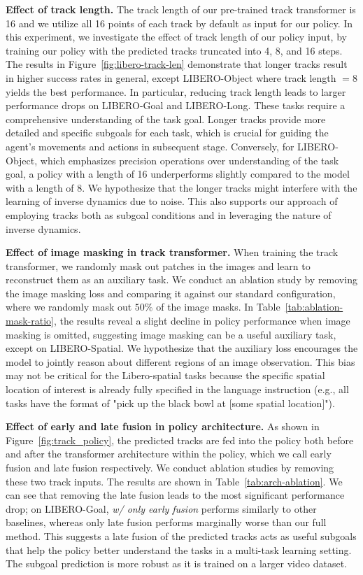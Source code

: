 \noindent\textbf{Effect of track length.}
The track length of our pre-trained track transformer is 16 and we utilize all 16 points of each track by default as input for our policy.
In this experiment, we investigate the effect of track length of our policy input, by training our policy with the predicted tracks truncated into 4, 8, and 16 steps.
The results in Figure~\ref{fig:libero-track-len} demonstrate that longer tracks result in higher success rates in general, except LIBERO-Object where track length $=8$ yields the best performance. 
In particular, reducing track length leads to larger performance drops on LIBERO-Goal and LIBERO-Long.
These tasks require a comprehensive understanding of the task goal. Longer tracks provide more detailed and specific subgoals for each task, which is crucial for guiding the agent's movements and actions in subsequent stage. 
Conversely, for LIBERO-Object, which emphasizes precision operations over understanding of the task goal, a policy with a length of 16 underperforms slightly compared to the model with a length of 8. We hypothesize that the longer tracks might interfere with the learning of inverse dynamics due to noise. This also supports our approach of employing tracks both as subgoal conditions and in leveraging the nature of inverse dynamics.


\noindent\textbf{Effect of image masking in track transformer.}
When training the track transformer, we randomly mask out patches in the images and learn to reconstruct them as an auxiliary task. We conduct an ablation study by removing the image masking loss and comparing it against our standard configuration, where we randomly mask out $50\%$ of the image masks. In Table~\ref{tab:ablation-mask-ratio}, the results reveal a slight decline in policy performance when image masking is omitted, suggesting image masking can be a useful auxiliary task, except on LIBERO-Spatial. We hypothesize that the auxiliary loss encourages the model to jointly reason about different regions of an image observation. This bias may not be critical for the Libero-spatial tasks because the specific spatial location of interest is already fully specified in the language instruction (e.g., all tasks have the format of "pick up the black bowl at [some spatial location]"). 

\noindent\textbf{Effect of early and late fusion in policy architecture.}
As shown in Figure~\ref{fig:track_policy}, the predicted tracks are fed into the policy both before and after the transformer architecture within the policy, which we call early fusion and late fusion respectively. We conduct ablation studies by removing these two track inputs. The results are shown in Table~\ref{tab:arch-ablation}. We can see that removing the late fusion leads to the most significant performance drop; on LIBERO-Goal, \textit{w/ only early fusion} performs similarly to other baselines, whereas only late fusion performs marginally worse than our full method. This suggests a late fusion of the predicted tracks acts as useful subgoals that help the policy better understand the tasks in a multi-task learning setting. The subgoal prediction is more robust as it is trained on a larger video dataset.